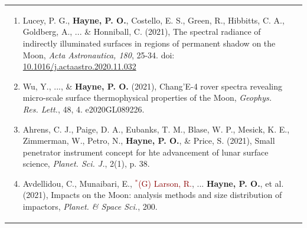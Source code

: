 \documentclass[letterpaper,10pt,twoside]{article}
\begin{document}
\begin{longtable}{@{} p{} p{}}
\begin{enumerate}[leftmargin=!,labelindent=2.5pt,itemindent=-10pt]
{            }
            \item{\small Lucey, P. G., \textbf{Hayne, P. O.}, Costello, E. S., Green, R., Hibbitts, C. A., Goldberg, A., ... \& Honniball, C. (2021), The spectral radiance of indirectly illuminated surfaces in regions of permanent shadow on the Moon, \textit{Acta Astronautica, 180}, 25-34. doi: \href{https://doi.org/10.1016/j.actaastro.2020.11.032}{10.1016/j.actaastro.2020.11.032}
            }
            \item{\small Wu, Y., ..., \& \textbf{Hayne, P. O.} (2021), Chang'E-4 rover spectra revealing micro-scale surface thermophysical properties of the Moon, {\it Geophys. Res. Lett.}, 48, 4. e2020GL089226.
            }
            \item{\small Ahrens, C. J., Paige, D. A., Eubanks, T. M., Blase, W. P., Mesick, K. E., Zimmerman, W., Petro, N., \textbf{Hayne, P. O.}, \& Price, S. (2021), Small penetrator instrument concept for hte advancement of lunar surface science, {\it  Planet. Sci. J.}, 2(1), p. 38.
            }
            \item{\small Avdellidou, C., Munaibari, E., \textcolor{darkred}{$^*$(G) Larson, R.}, ... \textbf{Hayne, P. O.}, et al. (2021), Impacts on the Moon: analysis methods and size distribution of impactors, {\it Planet. \& Space Sci.}, 200.
            }
            
        \end{enumerate}\\
\end{longtable}   
\end{document}
